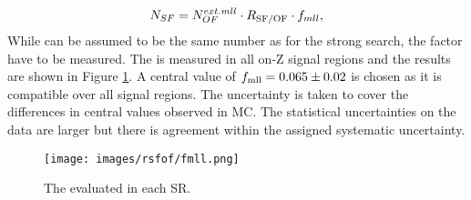 \begin{equation}
\label{eq:estFSEwk}
    N_{SF} = N_{OF}^{ext.mll} \cdot R_{\text{SF/OF}} \cdot f_{mll},
\end{equation}
While \Rsfof can be assumed to be the same number as for the strong search, the factor \fmll have to be measured.
The \fmll is measured in all on-Z signal regions and the results are shown in Figure \ref{fig:fmll}. A central value of $f_{\text{mll}}=0.065\pm0.02$ is chosen as it is compatible over all signal regions.
The uncertainty is taken to cover the differences in central values observed in MC.
The statistical uncertainties on the data are larger but there is agreement within the assigned systematic uncertainty.
\begin{figure}[htbp!]
\begin{center}
    \texttt{[image: images/rsfof/fmll.png]}
    \caption{The \fmll evaluated in each SR.}
\label{fig:fmll}
\end{center}
\end{figure}

